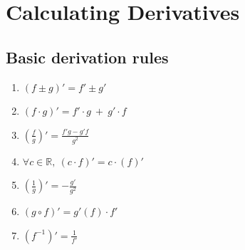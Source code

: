 \documentclass[a4paper]{report}
\begin{document}
\section{\textbf{Calculating Derivatives}}
\subsection{\textbf{Basic derivation rules}}
\begin{tcolorbox}
\begin{enumerate}
    \item $\left ( f \pm g \right )' = f' \pm g'$
    \item $\left ( f \cdot g \right )' = f' \cdot g \ + \ g' \cdot f$
    \item $\left ( \frac{f}{g} \right )' = \frac{f'g - g'f}{g^{2}}$
    \item $\forall c \in \mathbb{R}, \ \left ( c \cdot f \right )' = c \cdot \left ( f \right )'$
    \item $\left ( \frac{1}{g} \right )' = - \frac{g'}{g^{2}}$
    \item $\left ( g\circ f  \right )' = g'\left ( f \right ) \cdot f'$
    \item $\left ( f^{-1} \right )' = \frac{1}{f'}$
\end{enumerate}
\end{tcolorbox}
\end{document}
